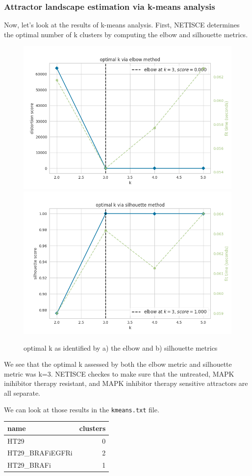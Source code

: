 \documentclass[
]{book}
\begin{document}
\hypertarget{section-id}{%
\subsubsection*{Attractor landscape estimation via k-means analysis}\label{section-id}}

Now, let's look at the results of k-means analysis. First, NETISCE determines the optimal number of k clusters by computing the elbow and silhouette metrics.

\begin{figure}
\includegraphics[width=0.5\linewidth]{crc/results/elbow} \includegraphics[width=0.5\linewidth]{crc/results/silhouette} \caption{optimal k as identified by a) the elbow and b) silhouette metrics}\label{fig:unnamed-chunk-36}
\end{figure}

We see that the optimal k assessed by both the elbow metric and silhouette metric was k=3. NETISCE checkes to make sure that the untreated, MAPK inihibitor therapy resistant, and MAPK inhibitor therapy sensitive attractors are all separate.

We can look at those results in the \texttt{kmeans.txt} file.

\begin{tabular}{l|r}
\hline
name & clusters\\
\hline
HT29 & 0\\
\hline
HT29\_BRAFiEGFRi & 2\\
\hline
HT29\_BRAFi & 1\\
\hline
\end{tabular}
\end{document}
